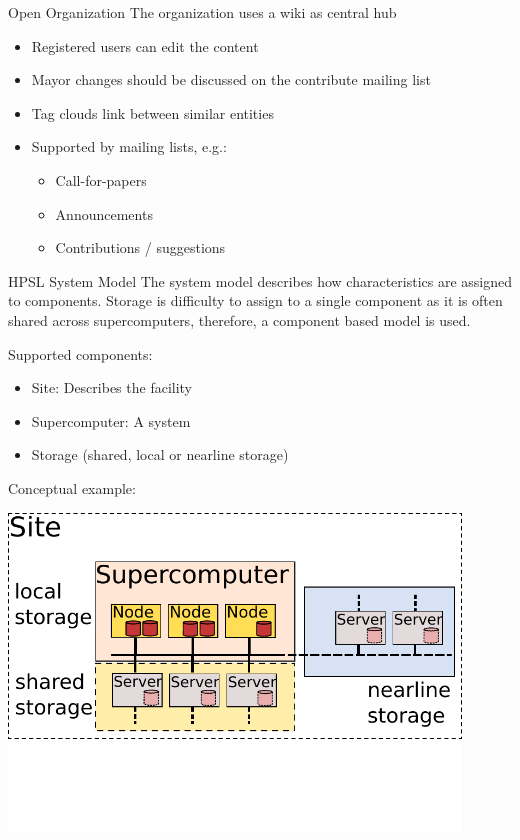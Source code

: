 \documentclass[portrait,a0paper,fontscale=0.4]{baposter}
\newcommand{\compresslist}{%
\setlength{\itemsep}{1pt}%
\setlength{\parskip}{0pt}%
\setlength{\parsep}{0pt}%
}
\begin{document}
\begin{poster}
\begin{posterbox}[name=overview,column=0,below=approach]{Open Organization}
The organization uses a wiki as central hub
\vspace*{-1em}
\begin{itemize}\compresslist
\item Registered users can edit the content
\item Mayor changes should be discussed on the contribute mailing list
\item Tag clouds link between similar entities
\item Supported by mailing lists, e.g.:
\begin{itemize}\compresslist
\item Call-for-papers
\item Announcements
\item Contributions / suggestions
\end{itemize}
\end{itemize}

\end{posterbox}


\begin{posterbox}[name=wps,column=0,above=bottom,below=overview]{HPSL System Model}
The system model describes how characteristics are assigned to components.
Storage is difficulty to assign to a single component as it is often shared across supercomputers,
therefore, a component based model is used.

Supported components:
\vspace*{-1em}
\begin{itemize}\compresslist
\item Site: Describes the facility
\item Supercomputer: A system
\item Storage (shared, local or nearline storage)
\end{itemize}

\vspace*{-1em}

Conceptual example:

\vspace*{-1em}
\begin{center}
\includegraphics[width=0.9\textwidth]{model}
\end{center}


\end{posterbox}
\end{poster}
\end{document}
